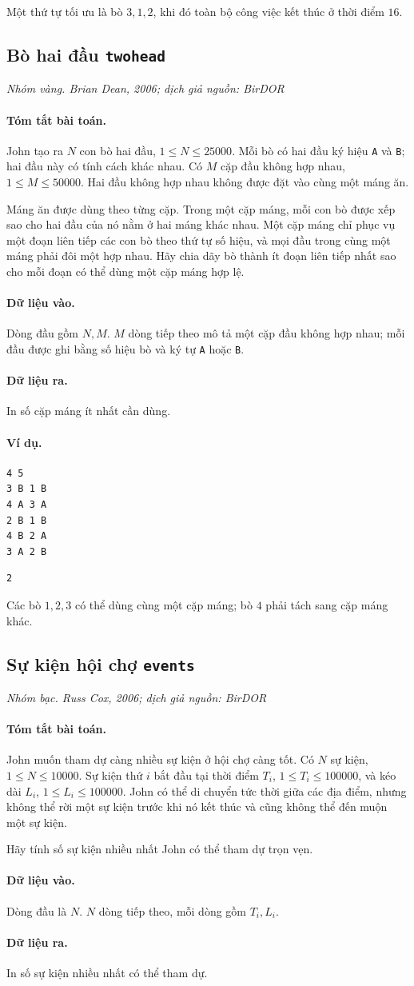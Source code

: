 \documentclass[11pt]{article}
\newcommand{\problem}[4]{%
  \subsection[#1 (#2)]{#1 \hfill {\normalsize\texttt{#2}}}%
  \noindent\textit{#3. #4}\par\smallskip
}
\newcommand{\iosec}[1]{\paragraph{#1}}
\begin{document}
Một thứ tự tối ưu là bò \(3,1,2\), khi đó toàn bộ công việc kết thúc ở thời
điểm \(16\).

\problem{Bò hai đầu}{twohead}{Nhóm vàng}{Brian Dean, 2006; dịch giả nguồn: BirDOR}

\iosec{Tóm tắt bài toán.}
John tạo ra \(N\) con bò hai đầu, \(1\le N\le 25000\). Mỗi bò có hai đầu ký
hiệu \texttt{A} và \texttt{B}; hai đầu này có tính cách khác nhau. Có
\(M\) cặp đầu không hợp nhau, \(1\le M\le 50000\). Hai đầu không hợp nhau
không được đặt vào cùng một máng ăn.

Máng ăn được dùng theo từng cặp. Trong một cặp máng, mỗi con bò được xếp sao
cho hai đầu của nó nằm ở hai máng khác nhau. Một cặp máng chỉ phục vụ một
đoạn liên tiếp các con bò theo thứ tự số hiệu, và mọi đầu trong cùng một máng
phải đôi một hợp nhau. Hãy chia dãy bò thành ít đoạn liên tiếp nhất sao cho
mỗi đoạn có thể dùng một cặp máng hợp lệ.

\iosec{Dữ liệu vào.}
Dòng đầu gồm \(N,M\). \(M\) dòng tiếp theo mô tả một cặp đầu không hợp nhau;
mỗi đầu được ghi bằng số hiệu bò và ký tự \texttt{A} hoặc \texttt{B}.

\iosec{Dữ liệu ra.}
In số cặp máng ít nhất cần dùng.

\iosec{Ví dụ.}
\begin{verbatim}
4 5
3 B 1 B
4 A 3 A
2 B 1 B
4 B 2 A
3 A 2 B
\end{verbatim}

\begin{verbatim}
2
\end{verbatim}

Các bò \(1,2,3\) có thể dùng cùng một cặp máng; bò \(4\) phải tách sang cặp
máng khác.

\problem{Sự kiện hội chợ}{events}{Nhóm bạc}{Russ Cox, 2006; dịch giả nguồn: BirDOR}

\iosec{Tóm tắt bài toán.}
John muốn tham dự càng nhiều sự kiện ở hội chợ càng tốt. Có \(N\) sự kiện,
\(1\le N\le 10000\). Sự kiện thứ \(i\) bắt đầu tại thời điểm \(T_i\),
\(1\le T_i\le 100000\), và kéo dài \(L_i\), \(1\le L_i\le 100000\). John có
thể di chuyển tức thời giữa các địa điểm, nhưng không thể rời một sự kiện
trước khi nó kết thúc và cũng không thể đến muộn một sự kiện.

Hãy tính số sự kiện nhiều nhất John có thể tham dự trọn vẹn.

\iosec{Dữ liệu vào.}
Dòng đầu là \(N\). \(N\) dòng tiếp theo, mỗi dòng gồm \(T_i,L_i\).

\iosec{Dữ liệu ra.}
In số sự kiện nhiều nhất có thể tham dự.
\end{document}
